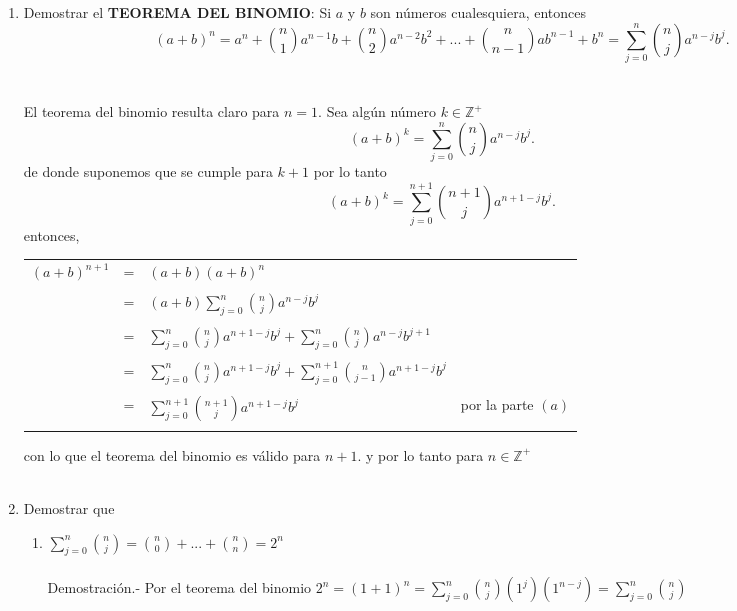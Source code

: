 \begin{enumerate}
\begin{enumerate}[\bfseries (a)]
          \item Demostrar el \textbf{TEOREMA DEL BINOMIO}: Si $a$ \; y \; $b$ son números cualesquiera, entonces
          $$(a+b)^n = a^n + {n \choose 1} a^{n-1} b + {n \choose 2} a^{n-2} b^2 + ... + {n \choose n-1} a b^{n-1} + b^n = \displaystyle \sum_{j=0}^n {n \choose j} a^{n-j} b^j.$$\\\\
          El teorema del binomio resulta claro para $n=1.$ Sea algún número $k \in \mathbb{Z}^+$  
          $$(a+b)^k =  \sum\limits_{j=0}^n {n \choose j} a^{n-j} b^j.$$
          de donde  suponemos que se cumple  para $k+1$ por lo tanto $$(a+b)^k =  \sum\limits_{j=0}^{n+1} {n+1 \choose j} a^{n+1-j} b^j.$$
          entonces,
            \begin{center}
              \begin{tabular}{r c l l}
                $(a+b)^{n+1}$&=&$(a+b)(a+b)^n$&\\\\
                &=&$(a+b) \displaystyle \sum_{j=0}^n {n \choose j} a^{n-j} b^j$&\\\\
                &=&$\displaystyle \sum_{j=0}^n {n \choose j} a^{n+1-j} b^j + \sum_{j=0}^{n} {n \choose j} a^{n-j} b^{j+1}$&\\\\
                &=&$\displaystyle \sum_{j=0}^n {n \choose j} a^{n+1-j} b^j + \sum_{j=0}^{n+1} {n \choose j-1} a^{n+1-j} b^{j}$&\\\\
                &=&$\displaystyle \sum_{j=0}^{n+1} {n+1 \choose j} a^{n+1-j} b^j$& por la parte $(a)$\\\\
              \end{tabular}
            \end{center}
          con lo que el teorema del binomio es válido para $n+1.$ y por lo tanto para $n \in  \mathbb{Z}^+$\\\\

          \item Demostrar que 
          \begin{enumerate}[\bfseries (i)]
            \item $\displaystyle\sum_{j=0}^{n} {n \choose j} = {n \choose 0} + ... + {n \choose n} = 2^n$\\\\
            Demostración.- \; Por el teorema del binomio $2^n=(1+1)^n = \sum\limits_{j=0}^n {n \choose j}(1^j)(1^{n-j})=\sum_{j=0}^n {n \choose j}$\\\\


\end{enumerate}
\end{enumerate}
\end{enumerate}
